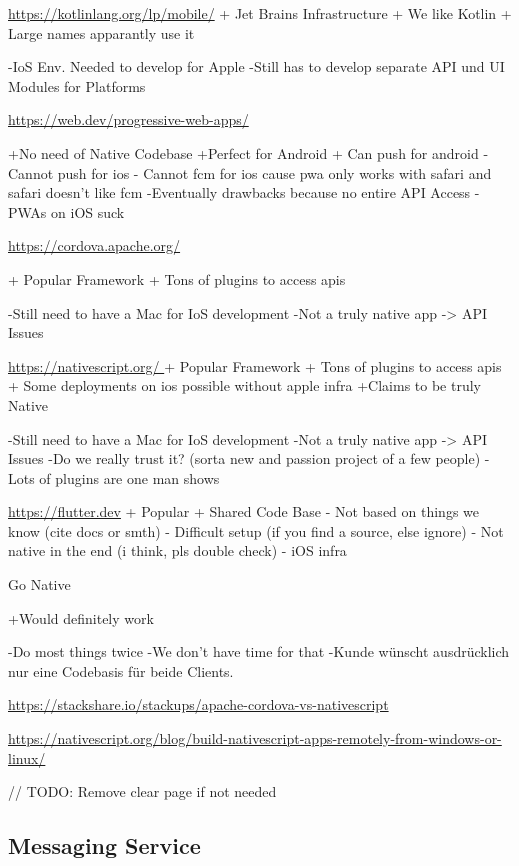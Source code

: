 \url{https://kotlinlang.org/lp/mobile/}
    + Jet Brains Infrastructure
    + We like Kotlin
    + Large names apparantly use it

    -IoS Env. Needed to develop for Apple 
    -Still has to develop separate API und UI Modules for Platforms 

\url{https://web.dev/progressive-web-apps/ }
	
    +No need of Native Codebase
    +Perfect for Android
    + Can push for android
    - Cannot push for ios
    - Cannot fcm for ios cause pwa only works with safari and safari doesn't like fcm
    -Eventually drawbacks because no entire API Access 
    -PWAs on iOS suck

\url{https://cordova.apache.org/} 

    + Popular Framework
    + Tons of plugins to access apis

    -Still need to have a Mac for IoS development  
    -Not a truly native app -> API Issues
 

\url{https://nativescript.org/ }
    + Popular Framework
    + Tons of plugins to access apis
    + Some deployments on ios possible without apple infra
    +Claims to be truly Native

    -Still need to have a Mac for IoS development
    -Not a truly native app -> API Issues
    -Do we really trust it? (sorta new and passion project of a few people)
    - Lots of plugins are one man shows

 
 \url{https://flutter.dev}
    + Popular
    + Shared Code Base
    - Not based on things we know (cite docs or smth)
    - Difficult setup (if you find a source, else ignore)
    - Not native in the end (i think, pls double check)
    - iOS infra


Go Native

    +Would definitely work

    -Do most things twice
    -We don't have time for that
    -Kunde wünscht ausdrücklich nur eine Codebasis für beide Clients.

\url{https://stackshare.io/stackups/apache-cordova-vs-nativescript}

\url{https://nativescript.org/blog/build-nativescript-apps-remotely-from-windows-or-linux/ }

// TODO: Remove clear page if not needed
\clearpage

\subsection{Messaging Service}\label{subsec:messaging-eval}


